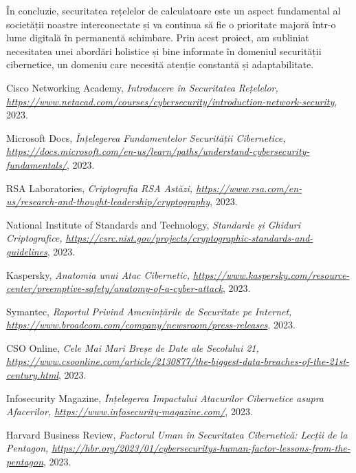 \documentclass[12pt]{article}
\begin{document}
În concluzie, securitatea rețelelor de calculatoare este un aspect fundamental al societății noastre interconectate și va continua să fie o prioritate majoră într-o lume digitală în permanentă schimbare. Prin acest proiect, am subliniat necesitatea unei abordări holistice și bine informate în domeniul securității cibernetice, un domeniu care necesită atenție constantă și adaptabilitate.

\newpage
{}

\begin{thebibliography}{Bibliografie}

Cisco Networking Academy,
\textit{Introducere în Securitatea Rețelelor, \url{https://www.netacad.com/courses/cybersecurity/introduction-network-security}},
2023.

Microsoft Docs,
\textit{Înțelegerea Fundamentelor Securității Cibernetice, \url{https://docs.microsoft.com/en-us/learn/paths/understand-cybersecurity-fundamentals/}},
2023.

RSA Laboratories,
\textit{Criptografia RSA Astăzi, \url{https://www.rsa.com/en-us/research-and-thought-leadership/cryptography}},
2023.

National Institute of Standards and Technology,
\textit{Standarde și Ghiduri Criptografice, \url{https://csrc.nist.gov/projects/cryptographic-standards-and-guidelines}},
2023.

Kaspersky,
\textit{Anatomia unui Atac Cibernetic, \url{https://www.kaspersky.com/resource-center/preemptive-safety/anatomy-of-a-cyber-attack}},
2023.

Symantec,
\textit{Raportul Privind Amenințările de Securitate pe Internet, \url{https://www.broadcom.com/company/newsroom/press-releases}},
2023.

CSO Online,
\textit{Cele Mai Mari Breșe de Date ale Secolului 21, \url{https://www.csoonline.com/article/2130877/the-biggest-data-breaches-of-the-21st-century.html}},
2023.

Infosecurity Magazine,
\textit{Înțelegerea Impactului Atacurilor Cibernetice asupra Afacerilor, \url{https://www.infosecurity-magazine.com/}},
2023.

Harvard Business Review,
\textit{Factorul Uman în Securitatea Cibernetică: Lecții de la Pentagon, \url{https://hbr.org/2023/01/cybersecuritys-human-factor-lessons-from-the-pentagon}},
2023.

\end{thebibliography}
\end{document}
